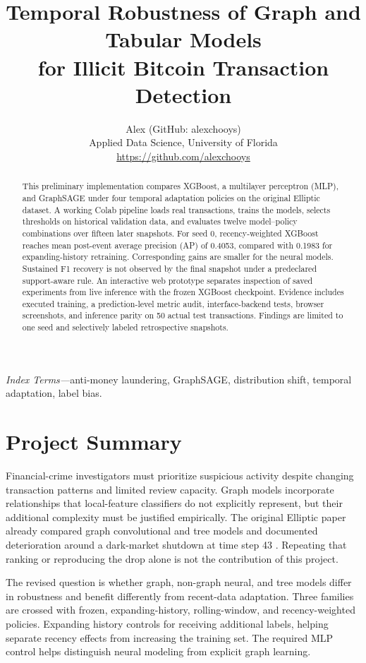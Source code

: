 \documentclass[10pt,twocolumn,letterpaper]{article}
\title{\vspace{-14pt}\fontsize{23}{26}\selectfont Temporal Robustness of Graph and Tabular Models\\for Illicit Bitcoin Transaction Detection}
\author{Alex (GitHub: alexchooys)\\\small Applied Data Science, University of Florida\\\small\url{https://github.com/alexchooys}}
\date{}
\begin{document}
\maketitle
\begin{abstract}
This preliminary implementation compares XGBoost, a multilayer perceptron (MLP), and GraphSAGE under four temporal adaptation policies on the original Elliptic dataset. A working Colab pipeline loads real transactions, trains the models, selects thresholds on historical validation data, and evaluates twelve model--policy combinations over fifteen later snapshots. For seed 0, recency-weighted XGBoost reaches mean post-event average precision (AP) of 0.4053, compared with 0.1983 for expanding-history retraining. Corresponding gains are smaller for the neural models. Sustained F1 recovery is not observed by the final snapshot under a predeclared support-aware rule. An interactive web prototype separates inspection of saved experiments from live inference with the frozen XGBoost checkpoint. Evidence includes executed training, a prediction-level metric audit, interface-backend tests, browser screenshots, and inference parity on 50 actual test transactions. Findings are limited to one seed and selectively labeled retrospective snapshots.
\end{abstract}
\noindent\textit{Index Terms---}anti-money laundering, GraphSAGE, distribution shift, temporal adaptation, label bias.

\section{Project Summary}
Financial-crime investigators must prioritize suspicious activity despite changing transaction patterns and limited review capacity. Graph models incorporate relationships that local-feature classifiers do not explicitly represent, but their additional complexity must be justified empirically. The original Elliptic paper already compared graph convolutional and tree models and documented deterioration around a dark-market shutdown at time step 43 \cite{weber}. Repeating that ranking or reproducing the drop alone is not the contribution of this project.

The revised question is whether graph, non-graph neural, and tree models differ in robustness and benefit differently from recent-data adaptation. Three families are crossed with frozen, expanding-history, rolling-window, and recency-weighted policies. Expanding history controls for receiving additional labels, helping separate recency effects from increasing the training set. The required MLP control helps distinguish neural modeling from explicit graph learning.
\end{document}
